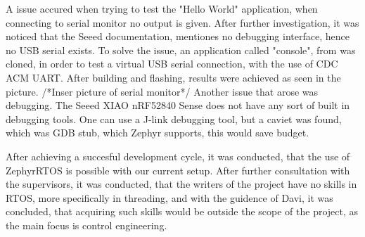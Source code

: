 \documentclass[a4paper,11pt]{article}
\begin{document}
A issue accured when trying to test the "Hello World" application, when connecting to serial monitor no output is given.
After further investigation, it was noticed that the Seeed documentation, mentiones no debugging interface, hence no USB serial exists.
To solve the issue, an application called "console", from  was cloned, in order to test a virtual USB serial connection, with the use of CDC ACM UART. \cite{gitZephyr}
After building and flashing, results were achieved as seen in the picture.
/*Inser picture of serial monitor*/
Another issue that arose was debugging. The Seeed XIAO nRF52840 Sense does not have any sort of built in debugging tools. 
One can use a J-link debugging tool, but a caviet was found, which was GDB stub, which Zephyr supports, this would save budget. 

After achieving a succesful development cycle, it was conducted, that the use of ZephyrRTOS is possible with our current setup.
After further consultation with the supervisors, it was conducted, that the writers of the project have no skills in RTOS, more specifically in threading, and with the guidence of Davi, it was concluded, that acquiring such skills would be outside the scope of the project, as the main focus is control engineering.



\end{document}
